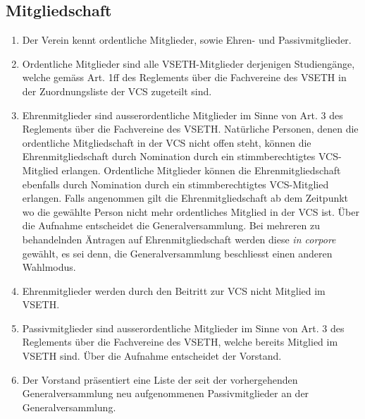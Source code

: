 \subsection{Mitgliedschaft}
\begin{enumerate}
\item Der Verein kennt ordentliche Mitglieder, sowie Ehren- und Passivmitglieder.
\item Ordentliche Mitglieder sind alle VSETH-Mitglieder derjenigen Studiengänge, welche gemäss Art. 1ff des Reglements über die Fachvereine des VSETH in der Zuordnungsliste der VCS zugeteilt sind.
\item Ehrenmitglieder sind ausserordentliche Mitglieder im Sinne von Art. 3 des Reglements über die Fachvereine des VSETH. Natürliche Personen, denen die ordentliche Mitgliedschaft in der VCS nicht offen steht, können die Ehrenmitgliedschaft durch Nomination durch ein stimmberechtigtes VCS-Mitglied erlangen. Ordentliche Mitglieder können die Ehrenmitgliedschaft ebenfalls durch Nomination durch ein stimmberechtigtes VCS-Mitglied erlangen. Falls angenommen gilt die Ehrenmitgliedschaft ab dem Zeitpunkt wo die gewählte Person nicht mehr ordentliches Mitglied in der VCS ist. Über die Aufnahme entscheidet die Generalversammlung. Bei mehreren zu behandelnden Äntragen auf Ehrenmitgliedschaft werden diese \textit{in corpore} gewählt, es sei denn, die Generalversammlung beschliesst einen anderen Wahlmodus.
\item Ehrenmitglieder werden durch den Beitritt zur VCS nicht Mitglied im VSETH.
\item Passivmitglieder sind ausserordentliche Mitglieder im Sinne von Art. 3 des Reglements über die Fachvereine des VSETH, welche bereits Mitglied im VSETH sind. Über die Aufnahme entscheidet der Vorstand.
\item Der Vorstand präsentiert eine Liste der seit der vorhergehenden Generalversammlung neu aufgenommenen Passivmitglieder an der Generalversammlung.
\end{enumerate}

